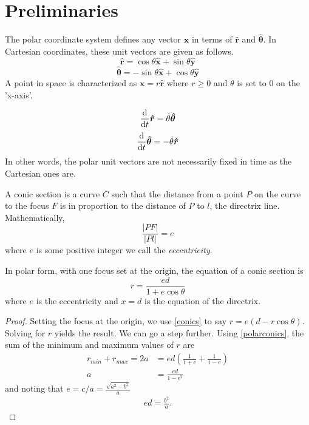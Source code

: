 \section{Preliminaries}\label{section-preliminaries}
\begin{defn}
The polar coordinate system defines any vector $\bm{x}$ in terms of $\bm{\hat{r}}$ and $\bm{\hat{\theta}}$. In Cartesian coordinates, these unit vectors are given as follows.
\begin{equation}
    \bm{\hat{r}} = \cos\theta \bm{\hat{x}} + \sin\theta \bm{\hat{y}}
\end{equation}
\begin{equation}
    \bm{\hat{\theta}} = -\sin\theta \bm{\hat{x}} + \cos\theta \bm{\hat{y}}
\end{equation}
A point in space is characterized as $\bm{x} = r\bm{\hat{r}}$ where $r \geq 0$ and $\theta$ is set to $0$ on the 'x-axis'.
\end{defn}
\begin{corollary}
\begin{equation}
    \frac{\mathrm{d}}{\mathrm{d}t}\bm{\hat{r}} = \dot{\theta}\bm{\hat{\theta}}    
\end{equation}
\begin{equation}
    \frac{\mathrm{d}}{\mathrm{d}t}\bm{\hat{\theta}} = -\dot{\theta}\bm{\hat{r}}
\end{equation}
In other words, the polar unit vectors are not necessarily fixed in time as the Cartesian ones are.
\end{corollary}
\begin{defn}
\label{conics}
A conic section is a curve $C$ such that the distance from a point $P$ on the curve to the focus $F$ is in proportion to the distance of $P$ to $l$, the directrix line. Mathematically, \begin{equation}
    \frac{|PF|}{|Pl|} = e
\end{equation}
where $e$ is some positive integer we call the \textit{eccentricity}. 
\end{defn}
\begin{theorem}
\label{polarconics}
In polar form, with one focus set at the origin, the equation of a conic section is \begin{equation}
    r = \frac{ed}{1 + e\cos\theta}
\end{equation}
where $e$ is the eccentricity and $x = d$ is the equation of the directrix. 
\end{theorem}
\begin{proof}
Setting the focus at the origin, we use \ref{conics} to say $r = e(d - r\cos\theta)$. Solving for $r$ yields the result. We can go a step further. Using \ref{polarconics}, the sum of the minimum and maximum values of $r$ are 
\begin{align}
    r_{min} + r_{max} = 2a &= ed\left(\frac{1}{1 + e} + \frac{1}{1 - e}\right)\\
    a &= \frac{ed}{1 - e^2}
\end{align}
and noting that $e = c / a = \frac{\sqrt{a^2 - b^2}}{a}$ 
\begin{align}\label{ed}
    ed = \frac{b^2}{a}.
\end{align}
\end{proof}
